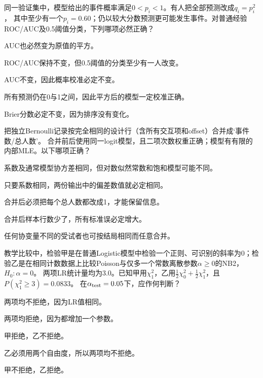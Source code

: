 \par\noindent\begin{minipage}{\linewidth}
同一验证集中，模型给出的事件概率满足$0<p_i<1$。有人把全部预测改成$q_i=p_i^2$，
其中至少有一个$p_i=0.60$；仍以较大分数预测更可能发生事件。对普通经验ROC/AUC及0.5阈值分类，下列哪项必然正确？
\begin{choices}
\item AUC也必然变为原值的平方。
\item ROC/AUC保持不变，但0.5阈值的分类至少有一人改变。
\item AUC不变，因此概率校准必定不变。
\item 所有预测仍在0与1之间，因此平方后的模型一定校准正确。
\item Brier分数必定不变，因为排序没有变化。
\end{choices}
\end{minipage}\par\medskip

\par\noindent\begin{minipage}{\linewidth}
把独立Bernoulli记录按完全相同的设计行（含所有交互项和offset）合并成‘事件数/总人数’。
合并前后使用同一logit模型，且二项次数权重正确；模型有有限的内部MLE。以下哪项正确？
\begin{choices}
\item 系数及通常模型协方差相同，但对数似然常数和饱和模型可能不同。
\item 只要系数相同，两份输出中的偏差数值就必定相同。
\item 合并后必须把每个总人数都改成1，才能保留信息。
\item 合并后样本行数少了，所有标准误必定增大。
\item 任何协变量不同的受试者也可按结局相同而任意合并。
\end{choices}
\end{minipage}\par\medskip

\par\noindent\begin{minipage}{\linewidth}
教学比较中，检验甲是在普通Logistic模型中检验一个正则、可识别的斜率为0；检验乙是在相同计数数据上比较Poisson与仅多一个常数离散参数$\alpha\ge0$的NB2，$H_0:\alpha=0$。
两项LR统计量均为3.0。已知甲用$\chi^2_1$，乙用$\tfrac12\chi^2_0+\tfrac12\chi^2_1$，且$P(\chi^2_1\ge3)=0.0833$。
在$\alpha_{\rm test}=0.05$下，应作何判断？
\begin{choices}
\item 两项均不拒绝，因为LR值相同。
\item 两项均拒绝，因为都增加一个参数。
\item 甲拒绝，乙不拒绝。
\item 乙必须用两个自由度，所以两项均不拒绝。
\item 甲不拒绝，乙拒绝。
\end{choices}
\end{minipage}\par\medskip

